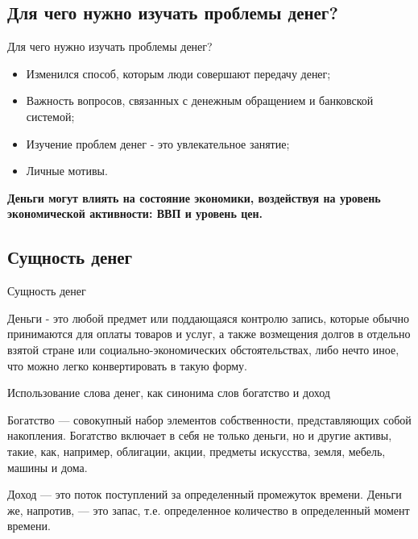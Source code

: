 \documentclass[_DKB_p1_Money.tex]{subfiles}
\begin{document}

\subsection{Для чего нужно изучать проблемы денег?}
\begin{frame}{Для чего нужно изучать проблемы денег?}
\begin{itemize}[<+->]
\item
Изменился способ, которым люди совершают передачу денег;
\item
Важность вопросов, связанных с денежным обращением и банковской системой;
\item
Изучение проблем денег - это увлекательное занятие;
\item
Личные мотивы.
\end{itemize}
\textbf{Деньги могут влиять на состояние экономики, воздействуя на уровень экономической активности: ВВП и уровень цен.}
\end{frame}

\subsection{Сущность денег}
\begin{frame}{Сущность денег}
\begin{block}{Деньги}
\quad
- это любой предмет или поддающаяся контролю запись, которые обычно принимаются для оплаты товаров и услуг, а также возмещения долгов в отдельно взятой стране или социально-экономических обстоятельствах, либо нечто иное, что можно легко конвертировать в такую форму.
\end{block}
\end{frame}
\begin{frame}{Использование слова денег, как синонима слов богатство и доход}
\begin{block}{Богатство}
\quad
— совокупный набор элементов собственности, представляющих собой накопления. Богатство включает в себя не только деньги, но и другие активы, такие, как, например, облигации, акции, предметы искусства, земля, мебель, машины и дома.
\end{block}
\begin{block}{Доход }
\quad
— это поток поступлений за определенный промежуток времени. Деньги же, напротив, — это запас, т.е. определенное количество в определенный момент времени.
\end{block}
\end{frame}
\end{document}

